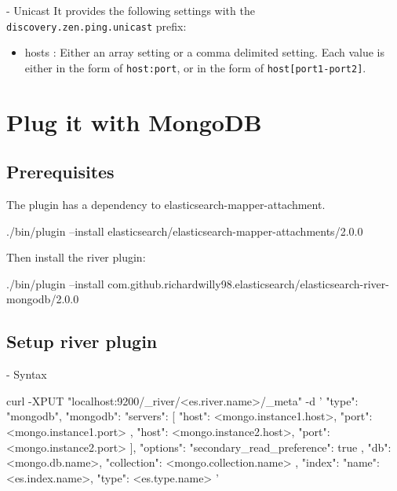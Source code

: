 \documentclass[]{beamer}
\begin{document}
\begin{frame}{\subsubsecname{} - Unicast}
  It provides the following settings with the \texttt{discovery.zen.ping.unicast} prefix:
  \begin{itemize}
    \item hosts : Either an array setting or a comma delimited setting. Each value is either in the form of \texttt{host:port}, or in the form of \texttt{host[port1-port2]}.
  \end{itemize}
\end{frame}

\section{Plug it with MongoDB}

\subsection{Prerequisites}

\begin{frame}[containsverbatim]{\subsecname{}}
  The plugin has a dependency to elasticsearch-mapper-attachment.

  \begin{command}
./bin/plugin --install elasticsearch/elasticsearch-mapper-attachments/2.0.0
  \end{command}

  Then install the river plugin:

  \begin{command}
./bin/plugin --install com.github.richardwilly98.elasticsearch/elasticsearch-river-mongodb/2.0.0
  \end{command}
\end{frame}

\subsection{Setup river plugin}

\begin{frame}[containsverbatim]{\subsecname{} - Syntax}
  \begin{command}
curl -XPUT "localhost:9200/_river/<es.river.name>/_meta" -d '
{
  "type": "mongodb",
  "mongodb": {
    "servers": [
      { "host": <mongo.instance1.host>, "port": <mongo.instance1.port> },
      { "host": <mongo.instance2.host>, "port": <mongo.instance2.port> }
    ],
    "options": { "secondary_read_preference": true },
    "db": <mongo.db.name>,
    "collection": <mongo.collection.name>
  },
  "index": {
    "name": <es.index.name>,
    "type": <es.type.name>
  }
}'
  \end{command}
\end{frame}
\end{document}
